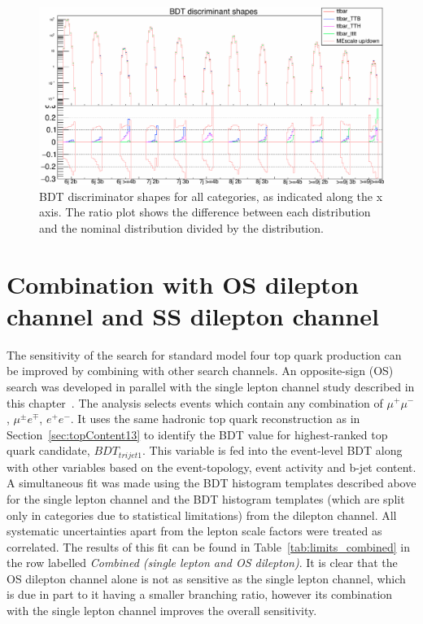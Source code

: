 \begin{figure}[ht]
\centering
    \includegraphics[width=\textwidth]{images/Run2/ttbarShapesLabels.png}
    \caption{BDT discriminator shapes for all categories, as indicated along the x axis. The ratio plot shows the difference between each distribution and the nominal \ttbar distribution divided by the \ttbar distribution.}
    \label{fig:TTB}
\end{figure}


\section{Combination with OS dilepton channel and SS dilepton channel ~\label{sec:combo13}}

The sensitivity of the search for standard model four top quark production can be improved by combining with other search channels. An opposite-sign (OS) search was developed in parallel with the single lepton channel study described in this chapter~\cite{CMS-PAS-TOP-16-016}. The analysis selects events which contain any combination of $\mu^{+}\mu^{-}$, $\mu^{\pm} e^{\mp}$, $e^{+}e^{-}$. It uses the same hadronic top quark reconstruction as in Section~\ref{sec:topContent13} to identify the BDT value for highest-ranked top quark candidate, $BDT_{trijet1}$. This variable is fed into the event-level BDT along with other variables based on the event-topology, event activity and b-jet content. A simultaneous fit was made using the BDT histogram templates described above for the single lepton channel and the BDT histogram templates (which are split only in \njets categories due to statistical limitations) from the dilepton channel. All systematic uncertainties apart from the lepton scale factors were treated as correlated. The results of this fit can be found in Table~\ref{tab:limits_combined} in the row labelled \emph{Combined (single lepton and OS dilepton)}. It is clear that the OS dilepton channel alone is not as sensitive as the single lepton channel, which is due in part to it having a smaller branching ratio, however its combination with the single lepton channel improves the overall sensitivity.\\

